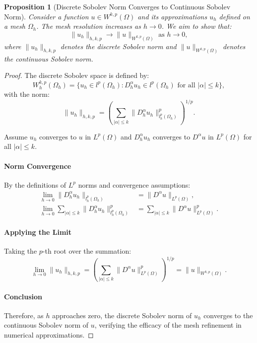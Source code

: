 \documentclass[11pt,a4paper]{article}
\theoremstyle{plain}
\newtheorem{proposition}[theorem]{Proposition}
\theoremstyle{definition}
\theoremstyle{remark}
\begin{document}
\begin{proposition}[Discrete Sobolev Norm Converges to Continuous Sobolev Norm]
    

Consider a function \( u \in W^{k,p}(\Omega) \) and its approximations \( u_h \) defined on a mesh \( \Omega_h \). The mesh resolution increases as \( h \to 0 \). We aim to show that:
\[ \|u_h\|_{h,k,p} \to \|u\|_{W^{k,p}(\Omega)} \text{ as } h \to 0, \]
where \( \|u_h\|_{h,k,p} \) denotes the discrete Sobolev norm and \( \|u\|_{W^{k,p}(\Omega)} \) denotes the continuous Sobolev norm.

\end{proposition}

\begin{proof}

The discrete Sobolev space is defined by:
\[ W^{k,p}_h(\Omega_h) = \{ u_h \in l^p(\Omega_h) : D^\alpha_h u_h \in l^p(\Omega_h) \text{ for all } |\alpha| \leq k \}, \]
with the norm:
\[ \|u_h\|_{h,k,p} = \left( \sum_{|\alpha| \leq k} \|D^\alpha_h u_h\|_{l^p_h(\Omega_h)}^p \right)^{1/p}. \]

Assume \( u_h \) converges to \( u \) in \( L^p(\Omega) \) and \( D^\alpha_h u_h \) converges to \( D^\alpha u \) in \( L^p(\Omega) \) for all \( |\alpha| \leq k \). 

\paragraph*{Norm Convergence}
By the definitions of \( L^p \) norms and convergence assumptions:
\begin{align*}
\lim_{h \to 0} \|D^\alpha_h u_h\|_{l^p_h(\Omega_h)} &= \|D^\alpha u\|_{L^p(\Omega)}, \\
\lim_{h \to 0} \sum_{|\alpha| \leq k} \|D^\alpha_h u_h\|_{l^p_h(\Omega_h)}^p &= \sum_{|\alpha| \leq k} \|D^\alpha u\|_{L^p(\Omega)}^p.
\end{align*}

\paragraph*{Applying the Limit}
Taking the \( p \)-th root over the summation:
\[ \lim_{h \to 0} \|u_h\|_{h,k,p} = \left( \sum_{|\alpha| \leq k} \|D^\alpha u\|_{L^p(\Omega)}^p \right)^{1/p} = \|u\|_{W^{k,p}(\Omega)}. \]

\paragraph*{Conclusion}
Therefore, as \( h \) approaches zero, the discrete Sobolev norm of \( u_h \) converges to the continuous Sobolev norm of \( u \), verifying the efficacy of the mesh refinement in numerical approximations.

\end{proof}
\end{document}

